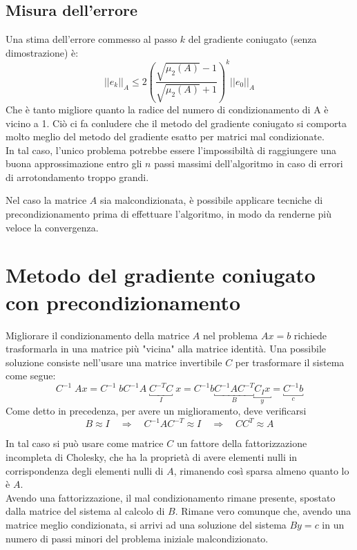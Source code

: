 \subsection{Misura dell'errore} Una stima dell'errore commesso al
passo $k$ del gradiente coniugato (senza dimostrazione) \`e:
$$
||e_{k}||_{A} \leq 2 \left( \frac{
\sqrt{\mu_{2}(A)}-1}{\sqrt{\mu_{2}(A)}+1} \right)^{k}
||e_{0}||_{A}
$$
Che \`e tanto migliore quanto la radice del numero di condizionamento di
A \`e vicino a 1. Ciò ci fa conludere che il metodo del gradiente
coniugato si comporta molto meglio del metodo del gradiente esatto per
matrici mal condizionate.\\ In tal caso, l'unico problema potrebbe
essere l'impossibiltà di raggiungere una buona approssimazione entro
gli $n$ passi massimi dell'algoritmo in caso di errori di
arrotondamento troppo grandi.

Nel caso la matrice $A$ sia malcondizionata, \`e possibile applicare
tecniche di precondizionamento prima di effettuare l'algoritmo, in
modo da renderne più veloce la convergenza.
 
\section{Metodo del gradiente coniugato con precondizionamento} Migliorare il
condizionamento della matrice $A$ nel problema $Ax=b$ richiede
trasformarla in una matrice più "vicina" alla matrice identità. Una
possibile soluzione consiste nell'usare una matrice invertibile $C$
per trasformare il sistema come segue:
$$
C^{-1}\; Ax = C^{-1}\; b C^{-1}A \; \underbracket{C^{-T}C}_{I} \; x =
C^{-1}b \underbracket{C^{-1}AC^{-T}}_{B} \underbracket{C_{I} x}_{y} =
\underbracket{C^{-1}b}_{c}
$$
Come detto in precedenza, per avere un miglioramento, deve verificarsi
$$
B \approx I \quad \Longrightarrow \quad C^{-1}AC^{-T} \approx I \quad
\Longrightarrow \quad CC^{T} \approx A
$$

In tal caso si può usare come matrice $C$ un fattore della
fattorizzazione incompleta di Cholesky, che ha la proprietà di avere
elementi nulli in corrispondenza degli elementi nulli di $A$,
rimanendo così sparsa almeno quanto lo \`e $A$. \\ Avendo una
fattorizzazione, il mal condizionamento rimane presente, spostato
dalla matrice del sistema al calcolo di $B$.  Rimane vero comunque
che, avendo una matrice meglio condizionata, si arrivi ad una
soluzione del sistema $By=c$ in un numero di passi minori del problema
iniziale malcondizionato.

